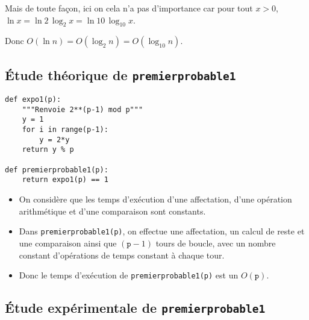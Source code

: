 Mais de toute façon, ici on cela n'a pas d'importance car pour tout $x>0$, $ \ln x = \ln 2 \, \log_{2} x = \ln 10\, \log_{10}x$.

Donc $ O(\ln n) = O(\log_{2} n) = O(\log_{10} n)$.

\subsection{Étude théorique de \texttt{premierprobable1}}


\begin{lstlisting}
def expo1(p):
    """Renvoie 2**(p-1) mod p"""
    y = 1
    for i in range(p-1):
        y = 2*y
    return y % p

def premierprobable1(p):
    return expo1(p) == 1
\end{lstlisting}

\begin{itemize}
\item[\textbullet] On considère que les temps d'exécution d'une affectation, d'une
  opération arithmétique et d'une comparaison sont constants.
\item[\textbullet] Dans \texttt{premierprobable1(p)}, on effectue une affectation, un
  calcul de reste et
  une comparaison ainsi que $(\texttt{p}-1)$ tours de boucle, avec un
  nombre constant d'opérations de temps constant à chaque tour.
\item[\textbullet] Donc le temps d'exécution de \texttt{premierprobable1(p)} est un
  $O(\texttt{p})$.
\end{itemize}

\subsection{Étude expérimentale de \texttt{premierprobable1}}

